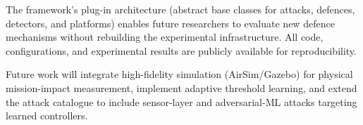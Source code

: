 The framework's plug-in architecture (abstract base classes for attacks, defences, detectors, and platforms) enables future researchers to evaluate new defence mechanisms without rebuilding the experimental infrastructure.
All code, configurations, and experimental results are publicly available for reproducibility.

Future work will integrate high-fidelity simulation (AirSim/Gazebo) for physical mission-impact measurement, implement adaptive threshold learning, and extend the attack catalogue to include sensor-layer and adversarial-ML attacks targeting learned controllers.
